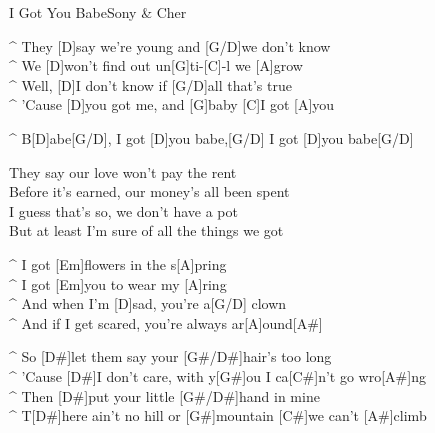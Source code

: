 \begin{song}{I Got You Babe}{Sony \& Cher}

\begin{guitar}
^ They [D]say we're young and [G/D]we don't know\\
^ We [D]won't find out un[G]ti-[C]-l we [A]grow\\
^ Well, [D]I don't know if [G/D]all that's true\\
^ 'Cause [D]you got me, and [G]baby [C]I got [A]you\\
\end{guitar}


\begin{guitar}
^ B[D]abe[G/D],    I got [D]you babe,[G/D]    I got [D]you babe[G/D]\\
\end{guitar}

\begin{guitar}
They say our love won't pay the rent\\
Before it's earned, our money's all been spent\\
I guess that's so, we don't have a pot\\
But at least I'm sure of all the things we got\\
\end{guitar}


\begin{guitar}
^ I got [Em]flowers  in the s[A]pring\\
^ I got [Em]you to wear my [A]ring\\
^ And when I'm [D]sad, you're a[G/D] clown\\
^ And if I get scared, you're always ar[A]ound[A#]\\
\end{guitar}

\begin{guitar}
^ So [D#]let them say your [G#/D#]hair's too long\\
^ 'Cause [D#]I don't care, with y[G#]ou I ca[C#]n't go wro[A#]ng\\
^ Then [D#]put your little [G#/D#]hand in mine\\
^ T[D#]here ain't no hill or [G#]mountain [C#]we can't [A#]climb\\
\end{guitar}



\end{song}
